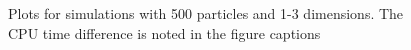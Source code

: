\begin{figure}
\begin{tabular}{cc}
\end{tabular}
\caption{Plots for simulations with 500 particles and 1-3 dimensions. The CPU time difference is noted in the figure captions}\label{fig:1b_500}
\end{figure}